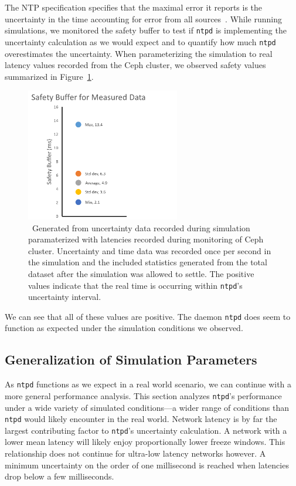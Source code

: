 The NTP specification specifies that the maximal error it reports is the 
uncertainty in the time accounting for error from all sources~\citep{Burbank2010}.
While running simulations, we monitored the safety buffer to test if 
\texttt{ntpd} is implementing the uncertainty calculation as we would expect
and to quantify how much \texttt{ntpd} overestimates the uncertainty.
When parameterizing the simulation to real latency values recorded from the 
Ceph cluster, we observed safety values summarized in Figure~\ref{fig:safety-data}.

\begin{figure}[!htbp]
  \caption{~Generated from uncertainty data recorded during simulation paramaterized
  with latencies recorded during monitoring of Ceph cluster. Uncertainty and time
  data was recorded once per second in the simulation and the included statistics 
  generated from the total dataset after the simulation was allowed to settle. 
  The positive values indicate that the real time is occurring within \texttt{ntpd}'s 
  uncertainty interval.}
  \label{fig:safety-data}
  \centering
  \includegraphics[width=0.6\textwidth]{5pointsSafety.png}
\end{figure}

We can see that all of these values are positive. The daemon \texttt{ntpd} 
does seem to function as expected under the simulation conditions we observed. 

\subsection{Generalization of Simulation Parameters}

As \texttt{ntpd} functions as we expect in a real world scenario,
we can continue with a more general performance analysis.
This section analyzes \texttt{ntpd}'s performance under a
wide variety of simulated conditions---a wider range of conditions than \texttt{ntpd}
would likely encounter in the real world. 
Network 
latency is by far the largest contributing factor to \texttt{ntpd}'s 
uncertainty calculation. A network with a lower mean latency will likely
enjoy proportionally lower freeze windows. This relationship does not continue 
for ultra-low latency networks however. A minimum uncertainty on the order
of one millisecond is reached when latencies drop below a few milliseconds.

